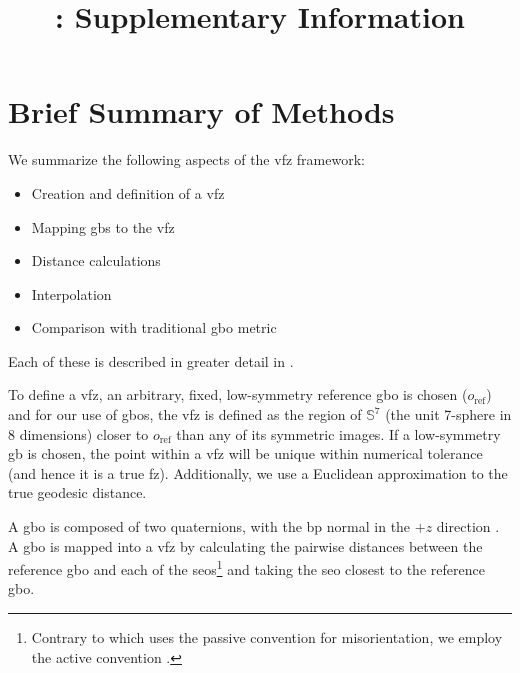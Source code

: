 \documentclass[preprint,12pt]{elsarticle}
\begin{document}
	\sloppy %
	
	\begin{frontmatter}
		
		\title{\mytitletwo{}: Supplementary Information}
		
		
		
	\end{frontmatter}
	
\tableofcontents

\section{Brief Summary of  Methods}

    We summarize the following aspects of the \gls{vfz} framework:
    \begin{itemize}
        \item Creation and definition of a \gls{vfz}
        \item Mapping \glspl{gb} to the \gls{vfz}
        \item Distance calculations
        \item Interpolation
        \item Comparison with traditional \gls{gbo} metric
    \end{itemize}
    Each of these is described in greater detail in \citet{bairdFiveDegreeofFreedomPropertyUnderReview}.
    
    To define a \gls{vfz}, an arbitrary, fixed, low-symmetry reference \gls{gbo} is chosen ($o_{\text{ref}}$) and for our use of \glspl{gbo}, the \gls{vfz} is defined as the region of $\mathbb{S}^7$ (the unit 7-sphere in 8 dimensions) closer to $o_{\text{ref}}$ than any of its symmetric images. If a low-symmetry \gls{gb} is chosen, the point within a \gls{vfz} will be unique within numerical tolerance (and hence it is a true \gls{fz}). Additionally, we use a Euclidean approximation to the true geodesic distance.
    
    
    A \gls{gbo} is composed of two quaternions, with the \gls{bp} normal in the $+z$ direction \cite{francisGeodesicOctonionMetric2019}. A \gls{gbo} is mapped into a \gls{vfz} by calculating the pairwise distances between the reference \gls{gbo} and each of the \glspl{seo}\footnote{Contrary to \citet{francisGeodesicOctonionMetric2019} which uses the passive convention for misorientation, we employ the active convention \cite{bairdFiveDegreeofFreedomPropertyUnderReview}. } and taking the \gls{seo} closest to the reference \gls{gbo}.
    
\end{document}
